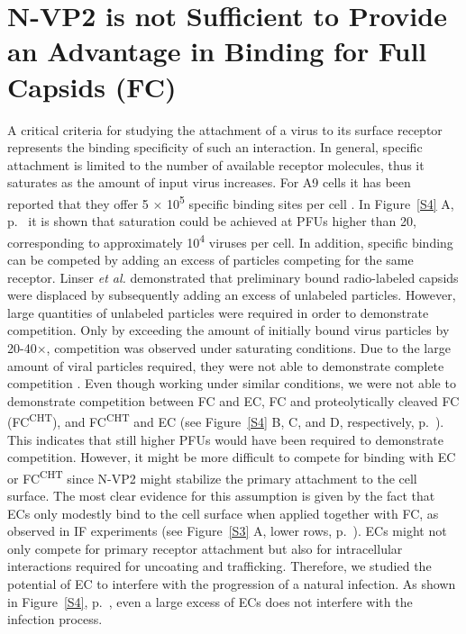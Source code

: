 \section{N-VP2 is not Sufficient to Provide an Advantage in Binding for Full Capsids (FC)}

A critical criteria for studying the attachment of a virus to its surface receptor represents the binding specificity of such an interaction. In general, specific attachment is limited to the number of available receptor molecules, thus it saturates as the amount of input virus increases. For A9 cells it has been reported that they offer 5 $\times$ 10\textsuperscript{5} specific binding sites per cell \cite{pmid20517}. In Figure~\ref{S4} A, p.~\pageref{S4} it is shown that saturation could be achieved at PFUs higher than 20, corresponding to approximately 10\textsuperscript{4} viruses per cell. In addition, specific binding can be competed by adding an excess of particles competing for the same receptor. Linser \textit{et al.} demonstrated that preliminary bound radio-labeled capsids were displaced by subsequently adding an excess of unlabeled particles. However, large quantities of unlabeled particles were required in order to demonstrate competition. Only by exceeding the amount of initially bound virus particles by 20-40$\times$, competition was observed under saturating conditions. Due to the large amount of viral particles required, they were not able to demonstrate complete competition \cite{pmid20517}. Even though working under similar conditions, we were not able to demonstrate competition between FC and EC, FC and proteolytically cleaved FC (FC\textsuperscript{CHT}), and FC\textsuperscript{CHT} and EC (see Figure~\ref{S4} B, C, and D, respectively, p.~\pageref{S4}). This indicates that still higher PFUs would have been required to demonstrate competition. However, it might be more difficult to compete for binding with EC or FC\textsuperscript{CHT} since N-VP2 might stabilize the primary attachment to the cell surface. The most clear evidence for this assumption is given by the fact that ECs only modestly bind to the cell surface when applied together with FC, as observed in IF experiments (see Figure~\ref{S3} A, lower rows, p.~\pageref{S3}). ECs might not only compete for primary receptor attachment but also for intracellular interactions required for uncoating and trafficking. Therefore, we studied the potential of EC to interfere with the progression of a natural infection. As shown in Figure~\ref{S4}, p.~\pageref{S4}, even a large excess of ECs does not interfere with the infection process. 

